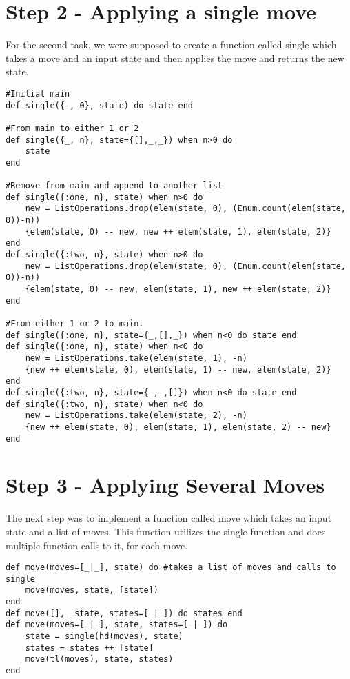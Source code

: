 \documentclass[a4paper,11pt]{article}
\begin{document}
\section{Step 2 - Applying a single move}
For the second task, we were supposed to create a function called single which takes a move and an input state and then applies the move and returns the new state.

\begin{verbatim}
#Initial main
def single({_, 0}, state) do state end

#From main to either 1 or 2
def single({_, n}, state={[],_,_}) when n>0 do 
    state 
end 

#Remove from main and append to another list
def single({:one, n}, state) when n>0 do
    new = ListOperations.drop(elem(state, 0), (Enum.count(elem(state, 0))-n))
    {elem(state, 0) -- new, new ++ elem(state, 1), elem(state, 2)}
end
def single({:two, n}, state) when n>0 do
    new = ListOperations.drop(elem(state, 0), (Enum.count(elem(state, 0))-n))
    {elem(state, 0) -- new, elem(state, 1), new ++ elem(state, 2)}
end

#From either 1 or 2 to main.
def single({:one, n}, state={_,[],_}) when n<0 do state end
def single({:one, n}, state) when n<0 do
    new = ListOperations.take(elem(state, 1), -n)
    {new ++ elem(state, 0), elem(state, 1) -- new, elem(state, 2)}
end
def single({:two, n}, state={_,_,[]}) when n<0 do state end
def single({:two, n}, state) when n<0 do
    new = ListOperations.take(elem(state, 2), -n)
    {new ++ elem(state, 0), elem(state, 1), elem(state, 2) -- new}
end
\end{verbatim}

\section{Step 3 - Applying Several Moves}
The next step was to implement a function called move which takes an input state and a list of moves. This function utilizes the single function and does multiple function calls to it, for each move.

\begin{verbatim}  
def move(moves=[_|_], state) do #takes a list of moves and calls to single
    move(moves, state, [state])
end
def move([], _state, states=[_|_]) do states end
def move(moves=[_|_], state, states=[_|_]) do
    state = single(hd(moves), state)
    states = states ++ [state]
    move(tl(moves), state, states)
end
\end{verbatim}
\end{document}
